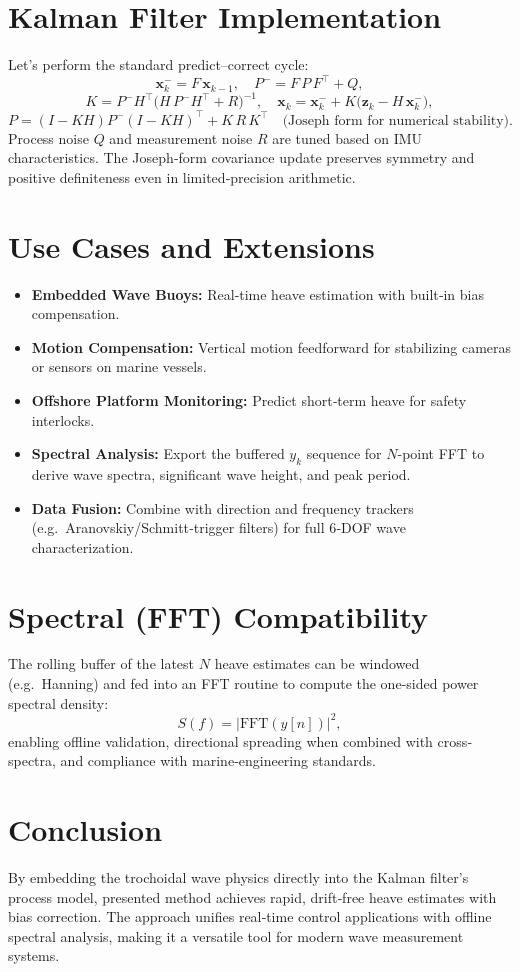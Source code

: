 \documentclass[11pt,letterpaper]{article}
\begin{document}
\section{Kalman Filter Implementation}
Let's perform the standard predict–correct cycle:
\[
\mathbf{x}_k^- = F\,\mathbf{x}_{k-1},\quad
P^- = F\,P\,F^\top + Q,
\]
\[
K = P^-H^\top\bigl(H\,P^-H^\top+R\bigr)^{-1},
\quad
\mathbf{x}_k = \mathbf{x}_k^- + K\bigl(\mathbf{z}_k - H\,\mathbf{x}_k^-\bigr),
\]
\[
P = (I-KH)P^-(I-KH)^\top + K\,R\,K^\top
\quad\text{(Joseph form for numerical stability).}
\]
Process noise \(Q\) and measurement noise \(R\) are tuned based on IMU characteristics.  The Joseph‐form covariance update preserves symmetry and positive definiteness even in limited‐precision arithmetic.

\section{Use Cases and Extensions}
\begin{itemize}
  \item \textbf{Embedded Wave Buoys:} Real‐time heave estimation with built‐in bias compensation.
  \item \textbf{Motion Compensation:} Vertical motion feedforward for stabilizing cameras or sensors on marine vessels.
  \item \textbf{Offshore Platform Monitoring:} Predict short‐term heave for safety interlocks.
  \item \textbf{Spectral Analysis:} Export the buffered \(y_k\) sequence for \(N\)-point FFT to derive wave spectra, significant wave height, and peak period.
  \item \textbf{Data Fusion:} Combine with direction and frequency trackers (e.g.\ Aranovskiy/Schmitt‐trigger filters) for full 6‐DOF wave characterization.
\end{itemize}

\section{Spectral (FFT) Compatibility}
The rolling buffer of the latest \(N\) heave estimates can be windowed (e.g.\ Hanning) and fed into an FFT routine to compute the one‐sided power spectral density:
\[
S(f) = \bigl|\mathrm{FFT}(y[n])\bigr|^2,
\]
enabling offline validation, directional spreading when combined with cross‐spectra, and compliance with marine‐engineering standards.

\section{Conclusion}
By embedding the trochoidal wave physics directly into the Kalman filter’s process model, presented method achieves rapid, drift‐free heave estimates with bias correction.  The approach unifies real‐time control applications with offline spectral analysis, making it a versatile tool for modern wave measurement systems.
\end{document}
